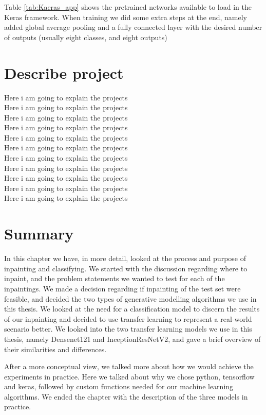 Table \ref{tab:Kaeras_app} shows the pretrained networks available to load in the Keras framework. 
When training we did some extra steps at the end, namely added global average pooling and a fully connected layer with the desired number of outputs (usually eight classes, and eight outputs)




\section{Describe project}
Here i am going to explain the projects\\
Here i am going to explain the projects\\
Here i am going to explain the projects\\
Here i am going to explain the projects\\
Here i am going to explain the projects\\
Here i am going to explain the projects\\
Here i am going to explain the projects\\
Here i am going to explain the projects\\
Here i am going to explain the projects\\
Here i am going to explain the projects\\
Here i am going to explain the projects\\

\section{Summary}
In this chapter we have, in more detail, looked at the process and purpose of inpainting and classifying.
We started with the discussion regarding where to inpaint, and the problem statements we wanted to test for each of the inpaintings. 
We made a decision regarding if inpainting of the test set were feasible, and decided the two types of generative modelling algorithms we use in this thesis. 
We looked at the need for a classification model to discern the results of our inpainting and decided to use transfer learning to represent a real-world scenario better.
We looked into the two transfer learning models we use in this thesis, namely Densenet121 and InceptionResNetV2, and gave a brief overview of their similarities and differences.

After a more conceptual view, we talked more about how we would achieve the experiments in practice.  Here we talked about why we chose python, tensorflow and keras, followed by custom functions needed for our machine learning algorithms. 
We ended the chapter with the description of the three models in practice.

 
